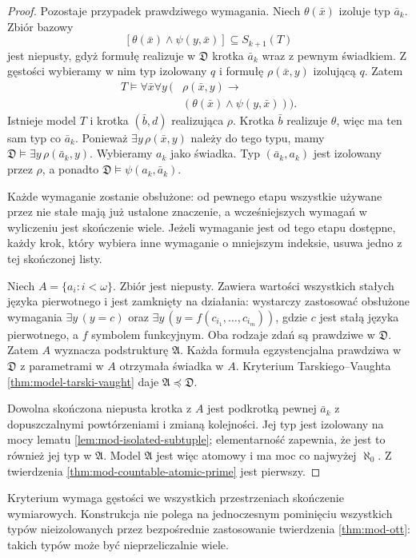 \begin{proof}
Pozostaje przypadek prawdziwego wymagania.
Niech $\theta(\bar x)$ izoluje typ $\bar a_k$.
Zbiór bazowy
\[
[\theta(\bar x)\land\psi(y,\bar x)]
\subseteq S_{k+1}(T)
\]
jest niepusty, gdyż formułę realizuje w
$\mathfrak D$ krotka $\bar a_k$ wraz z pewnym
świadkiem. Z gęstości wybieramy w nim typ
izolowany $q$ i formułę $\rho(\bar x,y)$
izolującą $q$. Zatem
\[
\begin{aligned}
T\models\forall\bar x\forall y\,\bigl(&\rho(\bar x,y)\to{}\\
& (\theta(\bar x)\land\psi(y,\bar x))\bigr).
\end{aligned}
\]
Istnieje model $T$ i krotka $(\bar b,d)$
realizująca $\rho$. Krotka $\bar b$ realizuje
$\theta$, więc ma ten sam typ co $\bar a_k$.
Ponieważ $\exists y\,\rho(\bar x,y)$ należy
do tego typu, mamy
$\mathfrak D\models\exists y\,\rho(\bar a_k,y)$.
Wybieramy $a_k$ jako świadka. Typ
$(\bar a_k,a_k)$ jest izolowany przez $\rho$,
a ponadto $\mathfrak D\models\psi(a_k,\bar a_k)$.

Każde wymaganie zostanie obsłużone: od pewnego
etapu wszystkie używane przez nie stałe mają
już ustalone znaczenie, a wcześniejszych
wymagań w wyliczeniu jest skończenie wiele.
Jeżeli wymaganie jest od tego etapu dostępne,
każdy krok, który wybiera inne wymaganie
o mniejszym indeksie, usuwa jedno z tej
skończonej listy.

Niech $A=\{a_i:i<\omega\}$. Zbiór jest niepusty.
Zawiera wartości wszystkich stałych języka
pierwotnego i jest zamknięty na działania:
wystarczy zastosować obsłużone wymagania
$\exists y\,(y=c)$ oraz
$\exists y\,(y=f(c_{i_1},\ldots,c_{i_m}))$,
gdzie $c$ jest stałą języka pierwotnego,
a $f$ symbolem funkcyjnym. Oba rodzaje
zdań są prawdziwe w $\mathfrak D$.
Zatem $A$ wyznacza podstrukturę $\mathfrak A$.
Każda formuła egzystencjalna prawdziwa w
$\mathfrak D$ z parametrami w $A$ otrzymała
świadka w $A$. Kryterium Tarskiego--Vaughta
\ref{thm:model-tarski-vaught} daje
$\mathfrak A\preccurlyeq\mathfrak D$.

Dowolna skończona niepusta krotka z $A$
jest podkrotką pewnej $\bar a_k$ z dopuszczalnymi
powtórzeniami i zmianą kolejności. Jej typ jest
izolowany na mocy lematu
\ref{lem:mod-isolated-subtuple}; elementarność
zapewnia, że jest to również jej typ w $\mathfrak A$.
Model $\mathfrak A$ jest więc atomowy i ma moc
co najwyżej $\aleph_0$. Z twierdzenia
\ref{thm:mod-countable-atomic-prime} jest pierwszy.
\end{proof}

Kryterium wymaga gęstości we wszystkich
przestrzeniach skończenie wymiarowych.
Konstrukcja nie polega na jednoczesnym pominięciu
wszystkich typów nieizolowanych przez bezpośrednie
zastosowanie twierdzenia \ref{thm:mod-ott}:
takich typów może być nieprzeliczalnie wiele.


